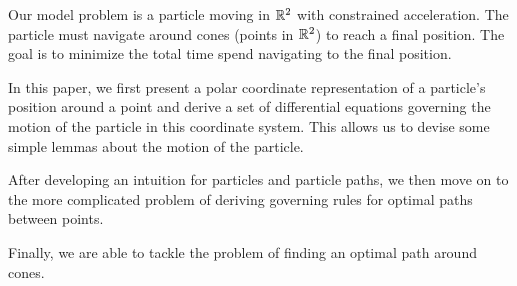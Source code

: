 Our model problem is a particle moving in $\mathbb R^2$ with constrained acceleration. The particle must navigate around cones (points in $\mathbb R^2$) to reach a final position. The goal is to minimize the total time spend navigating to the final position. 

In this paper, we first present a polar coordinate representation of a particle's position around a point and derive a set of differential equations governing the motion of the particle in this coordinate system. This allows us to devise some simple lemmas about the motion of the particle.

After developing an intuition for particles and particle paths, we then move on to the more complicated problem of deriving governing rules for optimal paths between points. 

Finally, we are able to tackle the problem of finding an optimal path around cones.